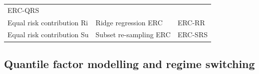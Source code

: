 \documentclass[
]{article}
\begin{document}
\begin{longtable}[]{@{}lll@{}}
\begin{minipage}[t]{0.14\columnwidth}
ERC-QRS\strut
\end{minipage}\tabularnewline
\begin{minipage}[t]{0.27\columnwidth}\raggedright
Equal risk contribution \textbar{} Ri\strut
\end{minipage} & \begin{minipage}[t]{0.50\columnwidth}\raggedright
Ridge regression \textbar{} ERC\strut
\end{minipage} & \begin{minipage}[t]{0.14\columnwidth}\raggedright
ERC-RR\strut
\end{minipage}\tabularnewline
\begin{minipage}[t]{0.27\columnwidth}\raggedright
Equal risk contribution \textbar{} Su\strut
\end{minipage} & \begin{minipage}[t]{0.50\columnwidth}\raggedright
Subset re-sampling \textbar{} ERC\strut
\end{minipage} & \begin{minipage}[t]{0.14\columnwidth}\raggedright
ERC-SRS\strut
\end{minipage}\tabularnewline
\bottomrule
\end{longtable}

\hypertarget{quantile-factor-modelling-and-regime-switching}{%
\subsection{Quantile factor modelling and regime switching}\label{quantile-factor-modelling-and-regime-switching}}
\end{document}
